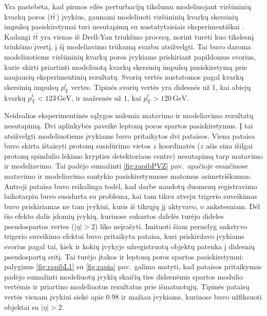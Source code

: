 \documentclass[a4paper, 12pt, oneside]{article}
\begin{document}
Yra pastebėta, kad pirmos eilės perturbacijų tikslumu modeliuojant viršūninių kvarkų poros ($t\bar{t}\,$)
įvykius, gaunami modeliuoti viršūninių kvarkų skersinių impulsų pasiskirstymai turi nesutapimų su nustatytaisiais
eksperimentiškai \cite{ttbarPT}.
Kadangi $t\bar{t}$ yra vienas iš Drell-Yan triukšmo procesų, norint turėti kuo tikslesnį triukšmo įvertį, į šį
modeliavimo trūkumą svarbu atsižvelgti.
Tai buvo daroma modeliuotiems viršūninių kvarkų poros įvykiams priskiriant papildomus svorius, kurie skirti
priartinti modeliuotą kvarkų skersinių impulsų pasiskirstymą prie naujausių eksperimentinių rezultatų.
Svorių vertės nustatomos pagal kvarkų skersinių impulsų $p_{\mathrm{T}}^{t}$ vertes.
Tipinės svorių vertės yra didesnės už $1$, kai abiejų kvarkų $p_{\mathrm{T}}^{t}<123 \, \mathrm{GeV}$, ir mažesnės už $1$,
kai $p_{\mathrm{T}}^{t}>120 \, \mathrm{GeV}$.

Neidealios eksperimentinės sąlygos nulemia matavimo ir modeliavimo rezultatų nesutapimą.
Dvi aplinkybės paveikė leptonų poros spartos pasiskirstymus.
Į tai atsižvelgti modeliuotiems įvykiams buvo pritaikytos dvi pataisos.
Viena pataisa buvo skirta ištaisyti protonų susidūrimo vietos $z$ koordinatės ($z$ ašis eina išilgai protonų
spindulio lėkimo krypties detektoriaus centre) nesutapimą tarp matavimo ir modeliavimo.
Tai padėjo sumažinti \ref{fig:rapibPVZ} pav.\ apačioje esančiuose matavimo ir modeliavimo santykio 
pasiskirstymuose matomus asimetriškumus.
Antroji pataisa buvo reikalinga todėl, kad darbe naudotų duomenų registravimo laikotarpiu buvo susidurta su problema,
kai tam tikru atveju trigerio suveikimas buvo priskiriamas ne tam įvykiui, kuris iš tikrųjų jį aktyvavo, o
ankstesniam.
Dėl šio efekto dalis įdomių įvykių, kuriuose sukurtos dalelės turėjo dideles pseudospartos vertes ($|\eta|>2$)
liko neįrašyti.
Imituoti šiam pernelyg ankstyvo trigerio suveikimo efektui buvo pritaikyta pataisa, kuri priskirdavo įvykiams
svorius pagal tai, kiek ir kokių įvykyje užregistruotų objektų patenka į didesnių pseudospartų sritį.
Tai turėjo įtakos ir leptonų poros spartos pasiskirstymui: palyginus \ref{fig:rapibL1} su \ref{fig:rapia} pav.\
galima matyti, kad pataisos pritaikymas padėjo sumažinti modeliuotų įvykių skaičių ties didesnėmis spartos modulio
vertėmis ir priartino modeliuotus rezultatus prie išmatuotųjų.
Tipinės pataisų vertės vienam įvykiui siekė apie $0.98$ ir mažiau įvykiams, kuriuose buvo užfiksuoti objektai su
$|\eta|>2$.
\end{document}
